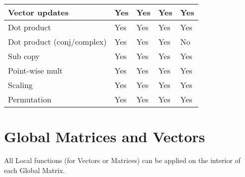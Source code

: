 \begin{table}[H]
\begin{tabular}{l|l|l|l|l}
Vector updates          & Yes    & Yes   & Yes     & \multicolumn{1}{l|}{Yes} \\ \hline
Dot product             & Yes    & Yes   & Yes     & \multicolumn{1}{l|}{Yes} \\ \hline
Dot product (conj/complex) & Yes    & Yes   & Yes     & \multicolumn{1}{l|}{No} \\ \hline
Sub copy                & Yes    & Yes   & Yes     & \multicolumn{1}{l|}{Yes} \\ \hline
Point-wise mult         & Yes    & Yes   & Yes     & \multicolumn{1}{l|}{Yes} \\ \hline
Scaling                 & Yes    & Yes   & Yes     & \multicolumn{1}{l|}{Yes} \\ \hline
Permutation             & Yes    & Yes     & Yes     & \multicolumn{1}{l|}{Yes} \\ \hline

\end{tabular}
\end{table}

\section{Global Matrices and Vectors}

All Local functions (for Vectors or Matrices) can be applied on the interior of each Global Matrix.


